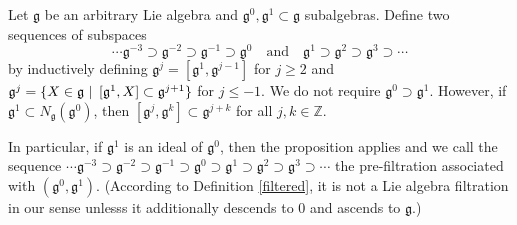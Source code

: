 \documentclass[leqno,12pt]{amsart} %
\begin{document}
\begin{lemma}
  Let ${\mathfrak g} $ be an arbitrary Lie algebra and
  ${\mathfrak g}^0, {\mathfrak g}^1 \subset {\mathfrak g}$ subalgebras. Define two
  sequences of subspaces
  $$ \cdots {\mathfrak g}^{-3} \supset {\mathfrak g}^{-2} \supset {\mathfrak g}^{-1}
  \supset {\mathfrak g}^0\quad\text{and}\quad {\mathfrak g}^1 \supset {\mathfrak
    g}^2\supset {\mathfrak g}^3 \supset \cdots$$ by inductively defining
  ${\mathfrak g}^j = [{\mathfrak g}^1, {\mathfrak g}^{j-1}]$ for $j\ge 2$ and
  ${\mathfrak g}^j = \{X \in {\mathfrak g}\,\left\vert\right.\, [{\mathfrak g}^1, X] \subset
  {\mathfrak g}^{j+1}\}$ for $j \le -1$.
  We do not require ${\mathfrak g}^0\supset {\mathfrak g}^1$. However, if
  ${\mathfrak g}^1 \subset N_{\mathfrak g}({\mathfrak g}^0)$, then
  $[{\mathfrak g}^j, {\mathfrak g}^k] \subset {\mathfrak g}^{j+k}$ for all
  $j,k \in {\mathbb Z}$.
\end{lemma}
\noindent%
In particular, if ${\mathfrak g}^1$ is an ideal of ${\mathfrak g}^0$, then the proposition
applies and we call the sequence
$\cdots {\mathfrak g}^{-3} \supset {\mathfrak g}^{-2} \supset {\mathfrak g}^{-1} \supset
{\mathfrak g}^0\supset{\mathfrak g}^1 \supset {\mathfrak g}^2\supset {\mathfrak g}^3
\supset \cdots$ the {\df pre-filtration} associated with
$({\mathfrak g}^0, {\mathfrak g}^1)$. (According to Definition \ref{filtered}, it is not a
Lie algebra filtration in our sense unlesss it additionally descends to $0$ and ascends to
${\mathfrak g}$.)
\end{document}

